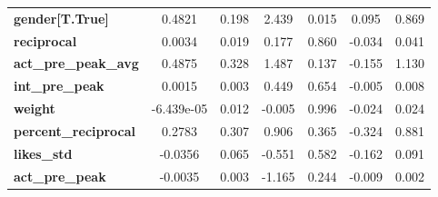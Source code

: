 \begin{center}
\begin{tabular}{lcccccc}
\textbf{gender[T.True]}      &       0.4821  &        0.198     &     2.439  &         0.015        &        0.095    &        0.869     \\
\textbf{reciprocal}          &       0.0034  &        0.019     &     0.177  &         0.860        &       -0.034    &        0.041     \\
\textbf{act\_pre\_peak\_avg} &       0.4875  &        0.328     &     1.487  &         0.137        &       -0.155    &        1.130     \\
\textbf{int\_pre\_peak}      &       0.0015  &        0.003     &     0.449  &         0.654        &       -0.005    &        0.008     \\
\textbf{weight}              &   -6.439e-05  &        0.012     &    -0.005  &         0.996        &       -0.024    &        0.024     \\
\textbf{percent\_reciprocal} &       0.2783  &        0.307     &     0.906  &         0.365        &       -0.324    &        0.881     \\
\textbf{likes\_std}          &      -0.0356  &        0.065     &    -0.551  &         0.582        &       -0.162    &        0.091     \\
\textbf{act\_pre\_peak}      &      -0.0035  &        0.003     &    -1.165  &         0.244        &       -0.009    &        0.002     \\
\bottomrule
\end{tabular}
\end{center}